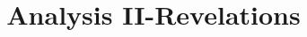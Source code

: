 \title{Analysis II-Revelations}
\pretitle{\pagestyle{empty}\begin{center}  \Huge \bfseries}
	\renewcommand{\maketitlehookb}{\centering \Large  \textit{Sommersemester 2018}}
\date{}